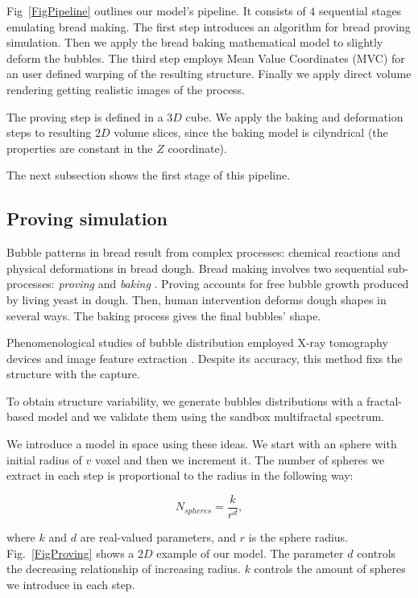 \documentclass[final,5p,times]{elsarticle}
\begin{document}
Fig~\ref{FigPipeline} outlines our model's  pipeline. It consists of $4$ sequential stages emulating bread making. The first step introduces an algorithm for bread proving simulation. Then we apply the bread baking mathematical model \cite{Powathil2004} to slightly deform the bubbles. The third step employs Mean Value Coordinates (MVC) \cite{Floater2003} for an user defined warping of the resulting structure. Finally we apply direct volume rendering \cite{Kruger2003} getting realistic images of the process.

The proving step is defined in a $3D$ cube. We apply the baking and deformation steps to resulting $2D$ volume slices, since the baking model is cilyndrical (the properties are constant in the $Z$ coordinate).


The next subsection shows the first stage of this pipeline.

\subsection{Proving simulation}
\label{breadprov}
Bubble patterns in bread result from complex processes: chemical reactions and physical deformations in bread dough. Bread making involves two sequential sub-processes: {\em proving} \cite{Babin2006} and {\em baking} \cite{Mondal2008}. Proving accounts for free bubble growth produced by living yeast in dough. Then, human intervention deforms dough shapes in several ways. The baking process gives the final bubbles' shape.

Phenomenological studies of bubble distribution employed X-ray tomography devices and image feature extraction \cite{Babin2006, VanDyck2014,  Gonzales2008}. Despite its accuracy, this method fixs the structure with the capture.

To obtain structure variability, we generate bubbles distributions with a fractal-based model \cite{Mandelbrot1982} and we validate them using the sandbox multifractal spectrum.

We introduce a model in space using these ideas. We start with an sphere with initial radius of $v$ voxel and then we increment it. The number of spheres we extract in each step is proportional to the radius in the following way:

\begin{equation}
N_{spheres} = \frac{k}{r^{d}} ,
\end{equation}

\noindent where $k$ and $d$ are real-valued parameters, and  $r$ is the sphere radius. Fig.~\ref{FigProving} shows a $2D$ example of our model.  The parameter $d$ controls the decreasing relationship of increasing radius. $k$ controls the amount of spheres we introduce in each step.
\end{document}
